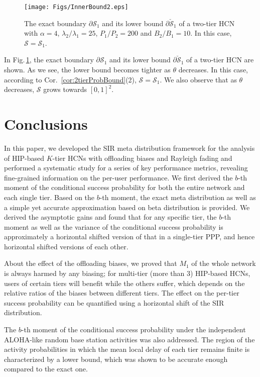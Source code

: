 \documentclass[12pt,draftclsnofoot,journal,onecolumn]{IEEEtran}
\def\figref#1{Fig.\,\ref{#1}}%
\newlength{\figwidth}
\begin{document}
\begin{figure} [!t]
	\begin{center}
		\texttt{[image: Figs/InnerBound2.eps]}
		\caption{The exact boundary $\partial\mathcal{S}_1$ and its lower bound $\partial\mathcal{\check S}_1$ of a two-tier HCN with $\alpha=4$, $\lambda_2/\lambda_1=25$, $P_1/P_2=200$ and $B_2/B_1=10$. In this case, $\mathcal{S}=\mathcal{S}_1$.}
		\label{fig:InnerBound}
	\end{center}
\end{figure}  
\vspace{0.5cm}
In \figref{fig:InnerBound}, the exact boundary $\partial\mathcal{S}_1$ and its lower bound $\partial\mathcal{\check S}_1$ of a two-tier HCN are shown. As we see, the lower bound becomes tighter as $\theta$ decreases. In this case, according to Cor.~\ref{cor:2tierProbBound}(2), $\mathcal{S}=\mathcal{S}_1$. We also observe that as $\theta$ decreases, $\mathcal{S}$ grows towards $[0,1]^2.$ 

\section{Conclusions}\label{sec:Conclusion}  
In this paper, we developed the SIR meta distribution framework for the analysis of HIP-based $K$-tier HCNs with offloading biases and Rayleigh fading and performed a systematic study for a series of key performance metrics, revealing fine-grained information on the per-user performance. We first derived the $b$-th moment of the conditional success probability for both the entire network and each single tier. Based on the $b$-th moment, the exact meta distribution as well as a simple yet accurate approximation based on beta distribution is provided. We derived the asymptotic gains and found that for any specific tier, the $b$-th moment as well as the variance of the conditional success probability is approximately a horizontal shifted version of that in a single-tier PPP, and hence horizontal shifted versions of each other. 

About the effect of the offloading biases, we proved that $M_1$ of the whole network is always harmed by any biasing; for multi-tier (more than $3$) HIP-based HCNs, users of certain tiers will benefit while the others suffer, which depends on the relative ratios of the biases between different tiers. The effect on the per-tier success probability can be quantified using a horizontal shift of the SIR distribution. 

The $b$-th moment of the conditional success probability under the independent ALOHA-like random base station activities was also addressed. The region of the activity probabilities in which the mean local delay of each tier remains finite is characterized by a lower bound, which was shown to be accurate enough compared to the exact one.    
\end{document}
